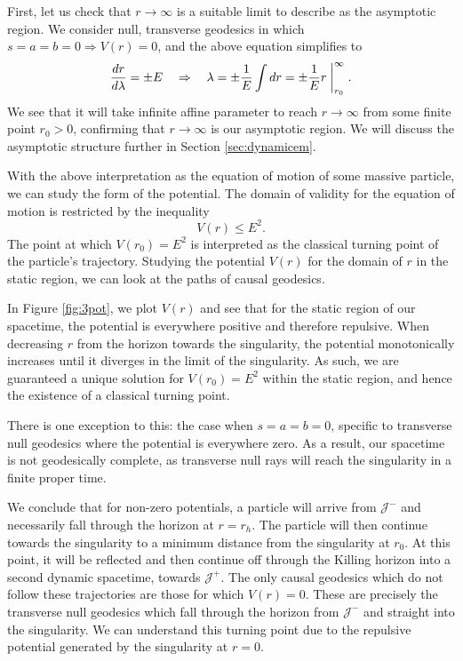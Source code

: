 First, let us check that $r \rightarrow \infty$ is a suitable limit to describe as the asymptotic region. We consider null, transverse geodesics in which $s = a = b = 0 \Rightarrow V(r) = 0$, and the above equation simplifies to 
\begin{equation*}
	\frac{d r}{d \lambda} = \pm E \quad \Rightarrow \quad \lambda = \pm \frac{1}{E} \int dr = \pm \frac{1}{E} r \; \bigg|^\infty_{r_0} \; .
\end{equation*}
We see that it will take infinite affine parameter to reach $r \rightarrow \infty$ from some finite point $r_0 > 0$, confirming that $r \rightarrow \infty$ is our asymptotic region. We will discuss the asymptotic structure further in Section \ref{sec:dynamicem}.  

With the above interpretation as the equation of motion of some massive particle, we can study the form of the potential. The domain of validity for the equation of motion is restricted by the inequality
\begin{equation*}
    V(r) \leq E^2.
\end{equation*}
The point at which $V(r_0) = E^2$ is interpreted as the classical turning point of the particle's trajectory. Studying the potential $V(r)$ for the domain of $r$ in the static region, we can look at the paths of causal geodesics.

In Figure \ref{fig:3pot}, we plot $V(r)$ and see that for the static region of our spacetime, the potential is everywhere positive and therefore repulsive. When decreasing $r$ from the horizon towards the singularity, the potential monotonically increases until it diverges in the limit of the singularity. As such, we are guaranteed a unique solution for $V(r_0) = E^2$ within the static region, and hence the existence of a classical turning point.

There is one exception to this: the case when $s = a = b = 0$, specific to transverse null geodesics where the potential is everywhere zero. As a result, our spacetime is not geodesically complete, as transverse null rays will reach the singularity in a finite proper time.

We conclude that for non-zero potentials, a particle will arrive from $\mathcal{J}^-$ and necessarily fall through the horizon at $r = r_h$. The particle will then continue towards the singularity to a minimum distance from the singularity at $r_0$. At this point, it will be reflected and then continue off through the Killing horizon into a second dynamic spacetime, towards $\mathcal{J}^+$. The only causal geodesics which do not follow these trajectories are those for which $V(r)=0$. These are precisely the transverse null geodesics which fall through the horizon from $\mathcal{J}^-$ and straight into the singularity. We can understand this turning point due to the repulsive potential generated by the singularity at $r = 0$.  

